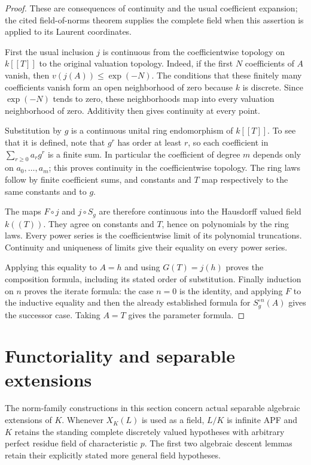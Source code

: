 \begin{proof}
These are consequences of continuity and the usual coefficient expansion;
the cited field-of-norms theorem supplies the complete field when this
assertion is applied to its Laurent coordinates.

First the usual inclusion $j$ is continuous from the coefficientwise
topology on $k[[T]]$ to the original valuation topology.
Indeed, if the first $N$ coefficients of $A$ vanish, then
$v(j(A))\leq\exp(-N)$. The conditions that these finitely many
coefficients vanish form an open neighborhood of zero because $k$ is
discrete. Since $\exp(-N)$ tends to zero, these neighborhoods map into
every valuation neighborhood of zero. Additivity then gives continuity
at every point.

Substitution by $g$ is a continuous unital ring endomorphism of
$k[[T]]$. To see that it is defined, note that $g^r$ has order at least
$r$, so each coefficient in $\sum_{r\geq0}a_rg^r$ is a finite sum.
In particular the coefficient of degree $m$ depends only on
$a_0,\ldots,a_m$; this proves continuity in the coefficientwise topology.
The ring laws follow by finite coefficient sums, and constants and $T$
map respectively to the same constants and to $g$.

The maps $F\circ j$ and $j\circ S_g$ are therefore continuous into
the Hausdorff valued field $k((T))$. They agree on constants and $T$,
hence on polynomials by the ring laws. Every power series is the
coefficientwise limit of its polynomial truncations. Continuity and
uniqueness of limits give their equality on every power series.

Applying this equality to $A=h$ and using $G(T)=j(h)$ proves the
composition formula, including its stated order of substitution.
Finally induction on $n$ proves the iterate formula: the case $n=0$
is the identity, and applying $F$ to the inductive equality and then the
already established formula for $S_g^{\circ n}(A)$ gives the successor
case. Taking $A=T$ gives the parameter formula.
\end{proof}

\section{Functoriality and separable extensions}

The norm-family constructions in this section concern actual separable
algebraic extensions of $K$. Whenever $X_K(L)$ is used as a field,
$L/K$ is infinite APF and $K$ retains the standing complete discretely
valued hypotheses with arbitrary perfect residue field of characteristic $p$.
The first two algebraic descent lemmas retain their explicitly stated
more general field hypotheses.


